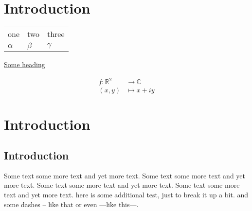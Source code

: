 \documentclass{article}
\begin{document}
\section{Introduction}

\begin{center}

\begin{tabular}{|l|l|l|}
\cline{1-3}
one & two & three\\
$\alpha$ & $\beta$ & $\gamma$\\
\cline{1-3}
\end{tabular}

\end{center}

\begin{center}
\underline{Some heading}
\end{center}

\begin{align*}
f: \mathbb{R}^2 &\longrightarrow \mathbb{C}\\
(x,y) &\mapsto x+iy
\end{align*}

\section{Introduction}
\subsection{Introduction}
\def\a{Some text some more text and yet more text. }
\a\a\a\a here is some additional test, just to break it up a bit.
and some dashes -- like that or even ---like this---.
\end{document}
